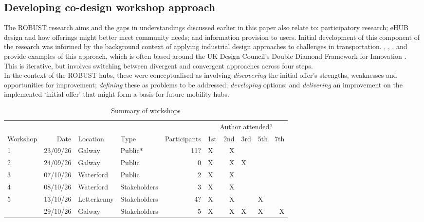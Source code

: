 \documentclass[preprint, 3p,
authoryear]{elsarticle} %
\begin{document}
\subsection{Developing co-design workshop
approach}\label{developing-co-design-workshop-approach}

The ROBUST research aims and the gaps in understandings discussed
earlier in this paper also relate to: participatory research; eHUB
design and how offerings might better meet community needs; and
information provision to users. Initial development of this component of
the research was informed by the background context of applying
industrial design approaches to challenges in transportation.
\citet{Coxon:2018aa}, \citet{Pink:2021aa}, \citet{Napper:2021aa}, and
\citet{Gaitan:2021aa} provide examples of this approach, which is often
based around the UK Design Council's Double Diamond Framework for
Innovation \citep{UK-Design-Council:0aa}.\\
This is iterative, but involves switching between divergent and
convergent approaches across four steps.\\
In the context of the ROBUST hubs, these were conceptualised as
involving \emph{discovering} the initial offer's strengths, weaknesses
and opportunities for improvement; \emph{defining} these as problems to
be addressed; \emph{developing} options; and \emph{delivering} an
improvement on the implemented `initial offer' that might form a basis
for future mobility hubs.

\begin{longtable}[t]{lrllrlrllr}
\caption{\label{tab:workshop_participants}Summary of workshops}\\
\toprule
\multicolumn{5}{c}{ } & \multicolumn{5}{c}{Author attended?} \\
\cmidrule(l{3pt}r{3pt}){6-10}
Workshop & Date & Location & Type & Participants & 1st & 2nd & 3rd & 5th & 7th\\
\midrule
1 & 23/09/26 & Galway & Public* & 11? & X & X &  &  & \\
2 & 24/09/26 & Galway & Public & 0 & X & X & X &  & \\
3 & 07/10/26 & Waterford & Public & 2 & X & X &  &  & \\
4 & 08/10/26 & Waterford & Stakeholders & 3 & X & X &  &  & \\
5 & 13/10/26 & Letterkenny & Stakeholders & 4? & X & X &  & X & \\
\addlinespace
6 & 29/10/26 & Galway & Stakeholders & 5 & X & X & X & X & X\\
\bottomrule
\end{longtable}
\end{document}
